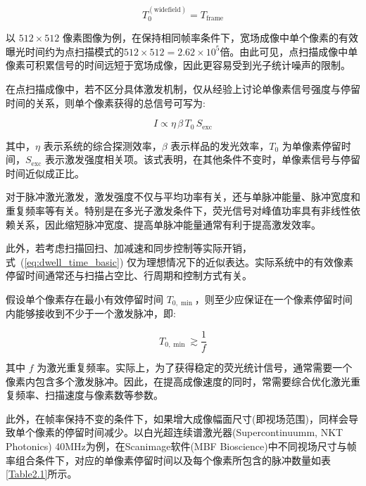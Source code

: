 \begin{equation}
T_0^{(\mathrm{widefield})}=T_{\mathrm{frame}}
\label{eq:widefield_exposure}
\end{equation}

以 $512\times512$ 像素图像为例，在保持相同帧率条件下，宽场成像中单个像素的有效曝光时间约为点扫描模式的$512\times512=2.62\times10^{5}$倍。由此可见，点扫描成像中单像素可积累信号的时间远短于宽场成像，因此更容易受到光子统计噪声的限制。

在点扫描成像中，若不区分具体激发机制，仅从经验上讨论单像素信号强度与停留时间的关系，则单个像素获得的总信号可写为:

\begin{equation}
I \propto \eta \,\beta \,T_0\, S_{\mathrm{exc}}
\label{eq:signal_general}
\end{equation}

其中，$\eta$ 表示系统的综合探测效率，$\beta$ 表示样品的发光效率，$T_0$ 为单像素停留时间，$S_{\mathrm{exc}}$ 表示激发强度相关项。该式表明，在其他条件不变时，单像素信号与停留时间近似成正比。

对于脉冲激光激发，激发强度不仅与平均功率有关，还与单脉冲能量、脉冲宽度和重复频率等有关。特别是在多光子激发条件下，荧光信号对峰值功率具有非线性依赖关系，因此缩短脉冲宽度、提高单脉冲能量通常有利于提高激发效率。

此外，若考虑扫描回扫、加减速和同步控制等实际开销，式~(\ref{eq:dwell_time_basic}) 仅为理想情况下的近似表达。实际系统中的有效像素停留时间通常还与扫描占空比、行周期和控制方式有关。

假设单个像素存在最小有效停留时间 $T_{0,\min}$，则至少应保证在一个像素停留时间内能够接收到不少于一个激发脉冲，即:

\begin{equation}
T_{0,\min}\gtrsim \frac{1}{f}
\label{eq:min_dwell_time}
\end{equation}

其中 $f$ 为激光重复频率。实际上，为了获得稳定的荧光统计信号，通常需要一个像素内包含多个激发脉冲。因此，在提高成像速度的同时，常需要综合优化激光重复频率、扫描速度与像素数等参数。

此外，在帧率保持不变的条件下，如果增大成像幅面尺寸(即视场范围)，同样会导致单个像素的停留时间减少。以白光超连续谱激光器(Supercontinuumm, NKT Photonics) 40MHz为例，在Scanimage软件(MBF Bioscience)中不同视场尺寸与帧率组合条件下，对应的单像素停留时间以及每个像素所包含的脉冲数量如表\ref{Table2.1}所示。

